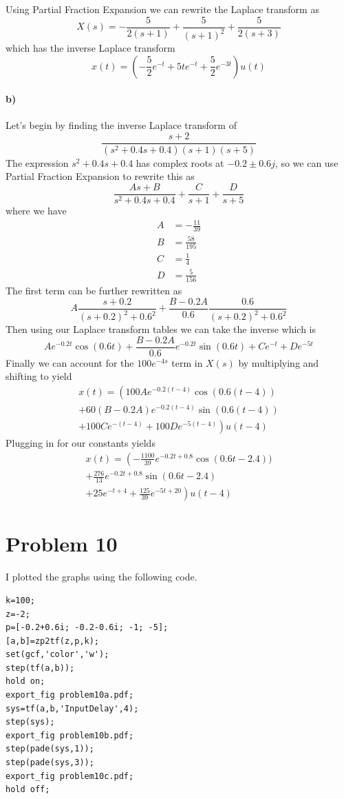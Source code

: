 \documentclass[12pt]{article}
\begin{document}
Using Partial Fraction Expansion we can rewrite the Laplace transform as
\[X(s)=-\frac{5}{2(s+1)} + \frac{5}{(s+1)^2} + \frac{5}{2(s+3)}\]
which has the inverse Laplace transform
\[x(t)=\left(-\frac{5}{2}e^{-t} + 5te^{-t} + \frac{5}{2}e^{-3t}\right)u(t)\]

\paragraph{b)}

Let's begin by finding the inverse Laplace transform of
\[\frac{s+2}{(s^2+0.4s+0.4)(s+1)(s+5)}\]
The expression \(s^2+0.4s+0.4\) has complex roots at \(-0.2\pm 0.6j\), so we can use Partial Fraction Expansion to rewrite this as
\[\frac{As+B}{s^2+0.4s+0.4}+\frac{C}{s+1}+\frac{D}{s+5}\]
where we have
\begin{align*}
    A&=-\frac{11}{39}\\
    B&=\frac{58}{195}\\
    C&=\frac{1}{4}\\
    D&=\frac{5}{156}
\end{align*}
The first term can be further rewritten as
\[A\frac{s+0.2}{(s+0.2)^2+0.6^2} + \frac{B-0.2A}{0.6}\frac{0.6}{(s+0.2)^2+0.6^2}\]
Then using our Laplace transform tables we can take the inverse which is
\[Ae^{-0.2t}\cos(0.6t)+\frac{B-0.2A}{0.6}e^{-0.2t}\sin(0.6t)+Ce^{-t}+De^{-5t}\]
Finally we can account for the \(100e^{-4s}\) term in \(X(s)\) by multiplying and shifting to yield
\begin{multline*}
    x(t)=\left(100Ae^{-0.2(t-4)}\cos(0.6(t-4))\right.\\
    +60(B-0.2A)e^{-0.2(t-4)}\sin(0.6(t-4))\\
    \left.+100Ce^{-(t-4)}+100De^{-5(t-4)}\right)u(t-4)
\end{multline*}
Plugging in for our constants yields
\begin{multline*}
    x(t)=\left(-\frac{1100}{39}e^{-0.2t+0.8}\cos(0.6t-2.4))\right.\\
    +\frac{276}{13}e^{-0.2t+0.8}\sin(0.6t-2.4)\\
    \left.+25e^{-t+4}+\frac{125}{39}e^{-5t+20}\right)u(t-4)
\end{multline*}

\section*{Problem 10}

I plotted the graphs using the following code.
\begin{verbatim}
k=100;
z=-2;
p=[-0.2+0.6i; -0.2-0.6i; -1; -5];
[a,b]=zp2tf(z,p,k);
set(gcf,'color','w');
step(tf(a,b));
hold on;
export_fig problem10a.pdf;
sys=tf(a,b,'InputDelay',4);
step(sys);
export_fig problem10b.pdf;
step(pade(sys,1));
step(pade(sys,3));
export_fig problem10c.pdf;
hold off;
\end{verbatim}
\end{document}
